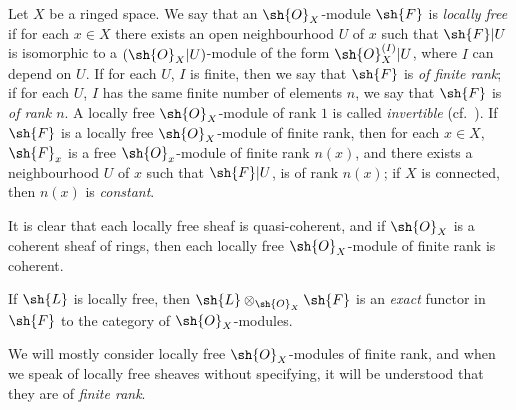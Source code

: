 \begin{env}[5.4.1]
\label{0.5.4.1}
Let $X$ be a ringed space.
We say that an $\sh{O}_X$-module $\sh{F}$ is \emph{locally free} if for each $x\in X$ there exists an open neighbourhood $U$ of $x$ such that $\sh{F}|U$ is isomorphic to a $(\sh{O}_X|U)$-module of the form $\sh{O}_X^{(I)}|U$, where $I$ can depend on $U$.
If for each $U$, $I$ is finite, then we say that $\sh{F}$ is \emph{of finite rank};
if for each $U$, $I$ has the same finite number of elements $n$, we say that $\sh{F}$ is \emph{of rank $n$}.
A locally free $\sh{O}_X$-module of rank $1$ is called \emph{invertible} (cf.~).
If $\sh{F}$ is a locally free $\sh{O}_X$-module of finite rank, then for each $x\in X$, $\sh{F}_x$ is a free $\sh{O}_x$-module of finite rank $n(x)$, and there exists a neighbourhood $U$ of $x$ such that $\sh{F}|U$, is of rank $n(x)$;
if $X$ is connected, then $n(x)$ is \emph{constant}.

It is clear that each locally free sheaf is quasi-coherent, and if $\sh{O}_X$ is a coherent sheaf of rings, then each locally free $\sh{O}_X$-module of finite rank is coherent.

If $\sh{L}$ is locally free, then $\sh{L}\otimes_{\sh{O}_X}\sh{F}$ is an \emph{exact} functor in $\sh{F}$ to the category of $\sh{O}_X$-modules.

We will mostly consider locally free $\sh{O}_X$-modules of finite rank,
and when we speak of locally free sheaves without specifying, it will be understood that they are of \emph{finite rank}.

\end{env}

